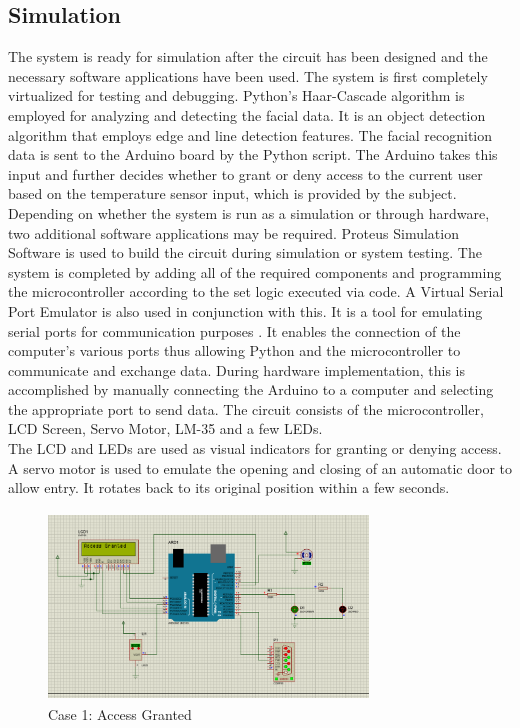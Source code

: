 \documentclass[conference]{IEEEtran}
\begin{document}
	\subsection{Simulation}
	The system is ready for simulation after the circuit has been designed and the necessary software applications have been used. The system is first completely virtualized for testing and debugging. Python's Haar-Cascade algorithm is employed for analyzing and detecting the facial data. It is an object detection algorithm that employs edge and line detection features. The facial recognition data is sent to the Arduino board by the Python script. The Arduino takes this input and further decides whether to grant or deny access to the current user based on the temperature sensor input, which is provided by the subject. Depending on whether the system is run as a simulation or through hardware, two additional software applications may be required. Proteus Simulation Software is used to build the circuit during simulation or system testing. The system is completed by adding all of the required components and programming the microcontroller according to the set logic executed via code.
	A Virtual Serial Port Emulator is also used in conjunction with this. It is a tool for emulating serial ports for communication purposes \cite{9}. It enables the connection of the computer's various ports thus allowing Python and the microcontroller to communicate and exchange data. During hardware implementation, this is accomplished by manually connecting the Arduino to a computer and selecting the appropriate port to send data. The circuit consists of the microcontroller, LCD Screen, Servo Motor, LM-35 and a few LEDs. \\
	The LCD and LEDs are used as visual indicators for granting or denying access\cite{10}. A servo motor is used to emulate the opening and closing of an automatic door to allow entry. It rotates back to its original position within a few seconds. 
	\begin{figure}
		\centering
		\includegraphics[width=8.5cm, height=5cm]{ProtC1.png}
		\caption{\label{fig:The-caption}Case 1: Access Granted}
	\end{figure}
\end{document}
